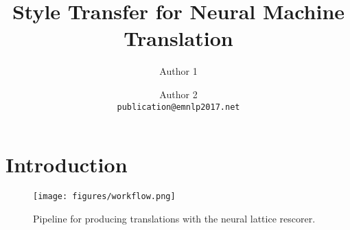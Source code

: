\documentclass[11pt,letterpaper]{article}
\title{ Style Transfer for Neural Machine Translation }
\author{Author 1 \and Author 2 \\
  {\tt publication@emnlp2017.net}}
\date{}
\begin{document}
\maketitle

\begin{abstract}

\end{abstract}


\section{Introduction}
\begin{figure}[t]
\label{fig:workflow}
\texttt{[image: figures/workflow.png]}
\caption{Pipeline for producing translations with the neural lattice rescorer.}
\end{figure}

\FloatBarrier


\end{document}

